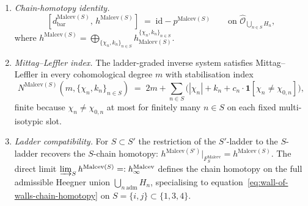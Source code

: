 \begin{theorem}
\begin{enumerate}[label=\textup{(\alph*)}]
$p^{\mathrm{Malcev}(S)}
\colon\bar B^{\mathrm{ch}}(A)|_{\widehat{\mathcal{O}}_{\bigcup_{n\in S}H_n}}
\twoheadrightarrow
\bar B^{\mathrm{ch}}(A)|_{\widehat{\mathcal{O}}_{\bigcup_{n\in S}H_n}}^{\prod_{n\in S}\Gamma_n}$
is the multi-invariants projector
$\prod_{n\in S}p^{\Gamma}_{H_n}$, a finite commuting product.
\item \emph{Chain-homotopy identity.}
\begin{equation}
\label{eq:malcev-ladder-chain-homotopy-identity}
[d^{\mathrm{Malcev}(S)}_{\mathrm{bar}},\,h^{\mathrm{Malcev}(S)}]
\;=\;
\mathrm{id}-p^{\mathrm{Malcev}(S)}
\qquad\text{on }\widehat{\mathcal{O}}_{\bigcup_{n\in S}H_n},
\end{equation}
where $h^{\mathrm{Malcev}(S)}=\bigoplus_{\{\chi_n,k_n\}_{n\in S}}
h^{\{\chi_n,k_n\}_{n\in S}}_{\mathrm{Malcev}(S)}$.
\item \emph{Mittag--Leffler index.} The ladder-graded inverse system
satisfies Mittag--Leffler in every cohomological degree $m$ with
stabilisation index
\[
 N^{\mathrm{Malcev}(S)}(m,\{\chi_n,k_n\}_{n\in S})
 \;=\;
 2m+\sum_{n\in S}\bigl(|\chi_n|+k_n+c_n\cdot\mathbf 1[\chi_n\neq\chi_{0,n}]\bigr),
\]
finite because $\chi_n\neq\chi_{0,n}$ at most for finitely many
$n\in S$ on each fixed multi-isotypic slot.
\item \emph{Ladder compatibility.} For $S\subset S'$ the restriction
of the $S'$-ladder to the $S$-ladder recovers the $S$-chain homotopy:
$h^{\mathrm{Malcev}(S')}|_{F_S^{\mathrm{Malcev}}}=h^{\mathrm{Malcev}(S)}$.
The direct limit $\varinjlim_{S}h^{\mathrm{Malcev}(S)}=:h^{\mathrm{Malcev}}_\infty$
defines the chain homotopy on the full admissible Heegner union
$\bigcup_{n\,\mathrm{adm}}H_n$, specialising to
equation~\textup{\eqref{eq:wall-of-walls-chain-homotopy}} on
$S=\{i,j\}\subset\{1,3,4\}$.
\end{enumerate}
\end{theorem}

